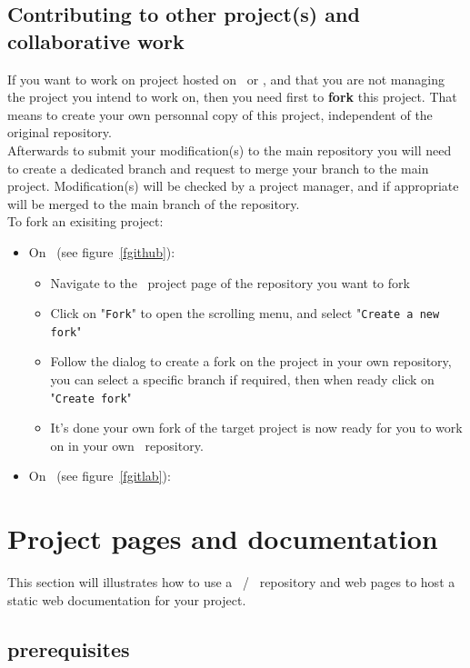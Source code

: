 \subsection{Contributing to other project(s) and collaborative work}

If you want to work on project hosted on \github\ or \gitlab, and that you are not managing the project you intend to work on, then you need first to {\bf{fork}} this project. 
That means to create your own personnal copy of this project, independent of the original repository. \\
Afterwards to submit your modification(s) to the main repository you will need to create a dedicated branch and request to merge your branch to the main project. 
Modification(s) will be checked by a project manager, and if appropriate will be merged to the main branch of the repository. \\[0.25cm]
To fork an exisiting project:
\begin{itemize}
\item On \github\ (see figure~\ref{fgithub}):
\begin{itemize}
\item Navigate to the \github\ project page of the repository you want to fork
\item Click on "\texttt{Fork}" to open the scrolling menu, and select "\texttt{Create a new fork}"
\item Follow the dialog to create a fork on the project in your own repository, you can select a specific branch if required, then when ready click on "\texttt{Create fork}"
\item It's done your own fork of the target project is now ready for you to work on in your own \github\ repository. 
\end{itemize}
\item On \gitlab\ (see figure~\ref{fgitlab}):

\end{itemize}

\newpage
\section{Project pages and documentation}

This section will illustrates how to use a \github\ / \gitlab\ repository and web pages to host a static web documentation for your project. 

\subsection{prerequisites}


